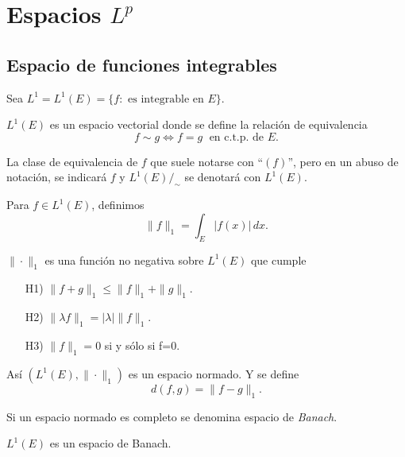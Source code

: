 \chapter{Espacios $L^p$}

\section{Espacio de funciones integrables}
Sea
$
L^1=L^1(E)=
\{
f:\mbox{ es integrable en } E
\}.
$

$L^1(E)$ es un espacio vectorial donde se define la relaci\'on de equivalencia
\[
f \sim g \Longleftrightarrow f=g \;\mbox{ en c.t.p. de } E.
\]   

 
La clase de equivalencia de $f$  que suele notarse con ``$(f)$'', pero en un abuso de notaci\'on, se indicar\'a  $f$
y $L^1(E)/_{\sim}$ se denotar\'a con $L^1(E)$.

Para $f\in L^1(E)$, definimos
\[
\|f\|_1=\int_E|f(x)|\,dx.
\]

$\| \cdot \|_1$ es una funci\'on no negativa sobre $L^1(E)$ que cumple
\begin{enumerate}
    \item [H1)] $\|f+g\|_1\leq \|f\|_1+\|g\|_1$.
    \item [H2)] $\|\lambda f\|_1=|\lambda|\|f\|_1$.
    \item [H3)] $\|f\|_1=0$ si y s\'olo si f=0.
\end{enumerate}

As\'i $(L^1(E),\|\cdot\|_1)$ es un espacio normado. 
Y se define 
\[
d(f,g)=\|f-g\|_1.
\]

Si un espacio normado es completo se denomina espacio de \emph{Banach}. 

\begin{teorema}{}\label{teorema:L1-completo}
$L^1(E)$ es un espacio de Banach.
\end{teorema}

